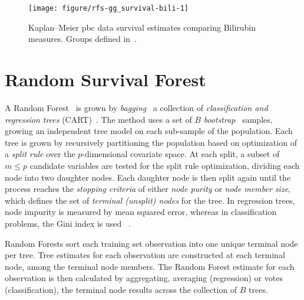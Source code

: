 \documentclass[nojss]{jss}\usepackage[]{graphicx}\usepackage[]{color}
\begin{document}
\begin{Schunk}
\begin{figure}[!htpb]

{\centering \texttt{[image: figure/rfs-gg\_survival-bili-1]} 

}

\caption{Kaplan--Meier pbc data survival estimates comparing Bilirubin measures. Groups defined in~\cite{fleming:1991}.\label{fig:gg_survival-bili}}
\end{figure}
\end{Schunk}


\section{Random Survival Forest}\label{S:rfsrcGrow}
A Random Forest~\citep{Breiman:2001} is grown by \emph{bagging}~\citep{Breiman:1996} a collection of \emph{classification and regression trees} (CART)~\citep{cart:1984}. The method uses a set of $B$ \emph{bootstrap}~\citep{bootstrap:1994} samples, growing an independent tree model on each sub-sample of the population. Each tree is grown by recursively partitioning the population based on optimization of a \emph{split rule} over the $p$-dimensional covariate space. At each split, a subset of $m \le p$ candidate variables are tested for the split rule optimization, dividing each node into two daughter nodes. Each daughter node is then split again until the process reaches the \emph{stopping criteria} of either \emph{node purity} or \emph{node member size}, which defines the set of \emph{terminal (unsplit) nodes} for the tree. In regression trees, node impurity is measured by mean squared error, whereas in classification problems, the Gini index is used~\citep{Friedman:2000} . 

Random Forests sort each training set observation into one unique terminal node per tree. Tree estimates for each observation are constructed at each terminal node, among the terminal node members. The Random Forest estimate for each observation is then calculated by aggregating, averaging (regression) or votes (classification), the terminal node results across the collection of $B$ trees.
\end{document}
